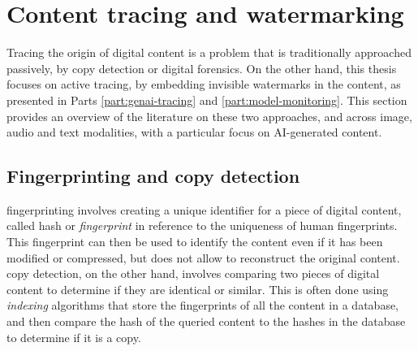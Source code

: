 \section{Content tracing and watermarking}

Tracing the origin of digital content is a problem that is traditionally approached passively, by copy detection or digital forensics.
On the other hand, this thesis focuses on active tracing, by embedding invisible watermarks in the content, as presented in Parts \ref{part:genai-tracing} and \ref{part:model-monitoring}.
This section provides an overview of the literature on these two approaches, and across image, audio and text modalities, with a particular focus on AI-generated content.

\subsection{Fingerprinting and copy detection}

\Gls*{fingerprinting} involves creating a unique identifier for a piece of digital content, called \gls*{hash} or \emph{fingerprint} in reference to the uniqueness of human fingerprints.
This fingerprint can then be used to identify the content even if it has been modified or compressed, but does not allow to reconstruct the original content.
\Gls*{copy detection}, on the other hand, involves comparing two pieces of digital content to determine if they are identical or similar. 
This is often done using \emph{\gls*{indexing}} algorithms that store the fingerprints of all the content in a database, and then compare the hash of the queried content to the hashes in the database to determine if it is a copy.

